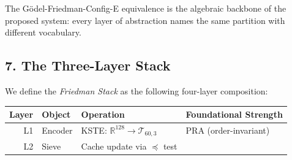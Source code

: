 \documentclass[
  11pt,
]{article}
\begin{document}
The Gödel-Friedman-Config-E equivalence is the algebraic backbone of the
proposed system: every layer of abstraction names the same partition
with different vocabulary.

\hypertarget{the-three-layer-stack}{%
\subsection{7. The Three-Layer Stack}\label{the-three-layer-stack}}

We define the \emph{Friedman Stack} as the following four-layer
composition:

\begin{longtable}[]{@{}rlll@{}}
\toprule
\begin{minipage}[b]{0.13\columnwidth}\raggedleft
Layer\strut
\end{minipage} & \begin{minipage}[b]{0.14\columnwidth}\raggedright
Object\strut
\end{minipage} & \begin{minipage}[b]{0.20\columnwidth}\raggedright
Operation\strut
\end{minipage} & \begin{minipage}[b]{0.42\columnwidth}\raggedright
Foundational Strength\strut
\end{minipage}\tabularnewline
\midrule
\endhead
\begin{minipage}[t]{0.13\columnwidth}\raggedleft
L1\strut
\end{minipage} & \begin{minipage}[t]{0.14\columnwidth}\raggedright
Encoder\strut
\end{minipage} & \begin{minipage}[t]{0.20\columnwidth}\raggedright
KSTE: \(\mathbb{R}^{128} \to \mathcal{T}_{60,3}\)\strut
\end{minipage} & \begin{minipage}[t]{0.42\columnwidth}\raggedright
PRA (order-invariant)\strut
\end{minipage}\tabularnewline
\begin{minipage}[t]{0.13\columnwidth}\raggedleft
L2\strut
\end{minipage} & \begin{minipage}[t]{0.14\columnwidth}\raggedright
Sieve\strut
\end{minipage} & \begin{minipage}[t]{0.20\columnwidth}\raggedright
Cache update via \(\preceq\) test\strut
\end{minipage} & \begin{minipage}[t]{0.42\columnwidth}\raggedright

\end{minipage}
\end{longtable}
\end{document}
